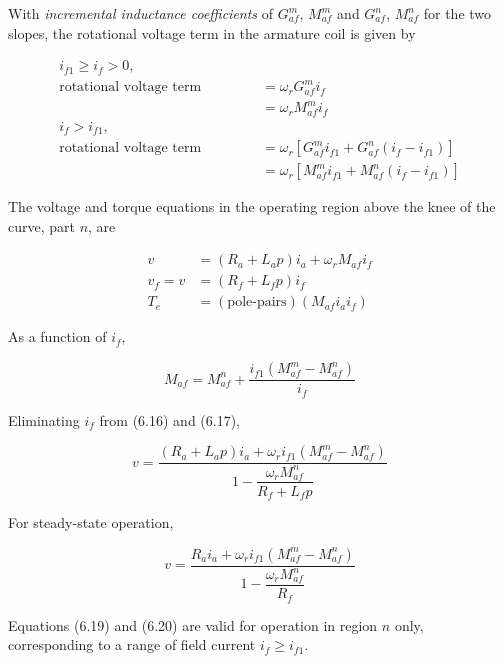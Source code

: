 \documentclass[a4paper,numbers=noenddot,12pt]{scrbook}
\begin{document}
With \textit{incremental inductance coefficients} of $G_{af}^m$, $M_{af}^m$ and $G_{af}^n$, $M_{af}^n$ for the two slopes, the rotational voltage term in the armature coil is given by

\begin{align*}
    i_{f1} \geq i_f > 0, \hspace{8em}\\
    \text{rotational voltage term} & =\omega_r G_{af}^m i_f \\
    & = \omega_r M_{af}^m i_f\\
    i_f > i_{f1}, \hspace{10em} &\\
    \text{rotational voltage term} & = \omega_r [G_{af}^m i_{f1} + G_{af}^n (i_f - i_{f1})] \\
    &=  \omega_r [M_{af}^m i_{f1} + M_{af}^n (i_f - i_{f1})]
\end{align*}

The voltage and torque equations in the operating region above the knee of the curve, part $n$, are

\begin{align}
    v & = (R_a + L_a p)i_a + \omega_r M_{af} i_f \\
    v_f = v & = (R_f + L_f p) i_f\\
    T_e & = (\text{pole-pairs})(M_{af} i_a i_f)
    \label{}
\end{align}

As a function of $i_f$,

\begin{equation*}
    M_{af} = M_{af}^n + \frac{i_{f1}(M_{af}^m - M_{af}^n)}{i_f}
\end{equation*}

Eliminating $i_f$ from (6.16) and (6.17),

\begin{equation}
    v = \frac{(R_a + L_a p) i_a + \omega_r i_{f1} (M_{af}^m - M_{af}^n)}{1 - \dfrac{\omega_r M_{af}^n}{R_f + L_f p}} 
    \label{}
\end{equation}

For steady-state operation,

\begin{equation}
    v = \frac{R_a i_a + \omega_r i_{f1}(M_{af}^m - M_{af}^n)}{1 - \dfrac{\omega_r M_{af}^n}{R_f}}
    \label{}
\end{equation}

Equations (6.19) and (6.20) are valid for operation in region $n$ only, corresponding to a range of field current $i_f \geq i_{f1}$.
\end{document}
